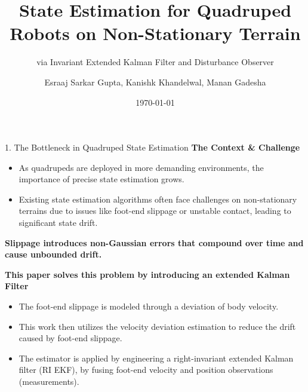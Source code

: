 \documentclass[aspectratio=169, 9pt]{beamer}
\title{State Estimation for Quadruped Robots on Non-Stationary Terrain}
\subtitle{via Invariant Extended Kalman Filter and Disturbance Observer}
\author{Esraaj Sarkar Gupta, Kanishk Khandelwal, Manan Gadesha}
\date{\today}
\begin{document}
\begin{frame}
    \titlepage
\end{frame}

\begin{frame}[t]{1. The Bottleneck in Quadruped State Estimation}
    \textbf{The Context \& Challenge}
    
    \begin{itemize}
        \item As quadrupeds are deployed in more demanding environments, the importance of precise state estimation grows.
        \item Existing state estimation algorithms often face challenges on non-stationary terrains due to issues like foot-end slippage or unstable contact, leading to significant state drift.
    \end{itemize}

    \vspace{0.5cm}
    
    \textbf{Slippage introduces non-Gaussian errors that compound over time and cause unbounded drift.}

    \vspace{0.5cm}
    \textbf{This paper solves this problem by introducing an extended Kalman Filter}
    \begin{itemize}
        \item The foot-end slippage is modeled through a deviation of body velocity.
        \item This work then utilizes the velocity deviation estimation to reduce the drift caused by foot-end slippage.
        \item The estimator is applied by engineering a right-invariant extended Kalman filter (RI EKF), by fusing foot-end velocity and position observations (measurements).
    \end{itemize}
    

\end{frame}
\end{document}
